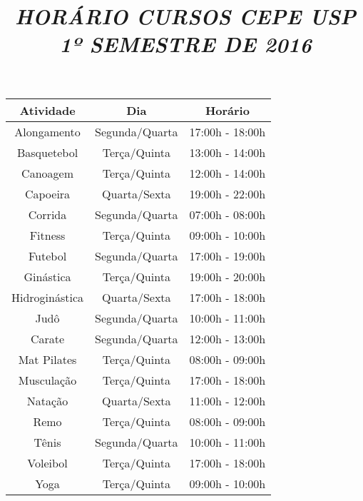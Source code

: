 \documentclass[12pt]{memoir}
\begin{document}
 
\title{\emph{\textbf{HORÁRIO CURSOS CEPE USP\\
1º SEMESTRE DE 2016}}}
\date{}
\maketitle

\begin{center}
\begin{tabular}{|c |c| c|}
\hline
Atividade      &   Dia             & Horário\\ 
\hline
Alongamento    & Segunda/Quarta    & 17:00h - 18:00h\\
\hline
Basquetebol    & Terça/Quinta      & 13:00h - 14:00h\\
\hline
Canoagem       & Terça/Quinta      & 12:00h - 14:00h\\
\hline
Capoeira       & Quarta/Sexta      & 19:00h - 22:00h\\
\hline
Corrida        & Segunda/Quarta    & 07:00h - 08:00h\\
\hline
Fitness        & Terça/Quinta      & 09:00h - 10:00h\\
\hline
Futebol        & Segunda/Quarta    & 17:00h - 19:00h\\
\hline
Ginástica      & Terça/Quinta      & 19:00h - 20:00h\\
\hline
Hidroginástica & Quarta/Sexta      & 17:00h - 18:00h\\
\hline
Judô           & Segunda/Quarta    & 10:00h - 11:00h\\
\hline
Carate         & Segunda/Quarta    & 12:00h - 13:00h\\
\hline
Mat Pilates    & Terça/Quinta      & 08:00h - 09:00h\\
\hline
Musculação     & Terça/Quinta      & 17:00h - 18:00h\\
\hline
Natação        & Quarta/Sexta      & 11:00h - 12:00h\\
\hline
Remo           & Terça/Quinta      & 08:00h - 09:00h\\
\hline
Tênis          & Segunda/Quarta    & 10:00h - 11:00h\\
\hline
Voleibol       & Terça/Quinta      & 17:00h - 18:00h\\
\hline
Yoga           & Terça/Quinta      & 09:00h - 10:00h\\
\hline
\end{tabular}
\end{center}
\end{document}
